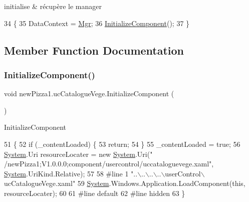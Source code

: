 initialise \& récupère le manager 


\begin{DoxyCode}
34         \{
35             DataContext = \hyperlink{classnewPizza1_1_1ucCatalogueVege_ad21f5966af508301ef7618c6a53af352}{Mgr};
36             \hyperlink{classnewPizza1_1_1ucCatalogueVege_afc2e8f9dfd99c8252e745a8636e230da}{InitializeComponent}();
37         \}
\end{DoxyCode}


\subsection{Member Function Documentation}
\mbox{\label{classnewPizza1_1_1ucCatalogueVege_afc2e8f9dfd99c8252e745a8636e230da}} 
\subsubsection{\texorpdfstring{Initialize\+Component()}{InitializeComponent()}\hspace{0.1cm}{\footnotesize\ttfamily [1/6]}}
{\footnotesize\ttfamily void new\+Pizza1.\+uc\+Catalogue\+Vege.\+Initialize\+Component (\begin{DoxyParamCaption}{ }\end{DoxyParamCaption})\hspace{0.3cm}{\ttfamily [inline]}}



Initialize\+Component 


\begin{DoxyCode}
51                                           \{
52             \textcolor{keywordflow}{if} (\_contentLoaded) \{
53                 \textcolor{keywordflow}{return};
54             \}
55             \_contentLoaded = \textcolor{keyword}{true};
56             \hyperlink{namespaceSystem}{System}.Uri resourceLocater = \textcolor{keyword}{new} \hyperlink{namespaceSystem}{System}.Uri(\textcolor{stringliteral}{"
      /newPizza1;V1.0.0.0;component/usercontrol/uccataloguevege.xaml"}, \hyperlink{namespaceSystem}{System}.UriKind.Relative);
57             
58 \textcolor{preprocessor}{            #line 1 "..\(\backslash\)..\(\backslash\)..\(\backslash\)..\(\backslash\)userControl\(\backslash\)ucCatalogueVege.xaml"
}
59             \hyperlink{namespaceSystem}{System}.Windows.Application.LoadComponent(\textcolor{keyword}{this}, resourceLocater);
60             
61 \textcolor{preprocessor}{            #line default
}
62 \textcolor{preprocessor}{            #line hidden
}
63         \}
\end{DoxyCode}
\mbox{\label{classnewPizza1_1_1ucCatalogueVege_afc2e8f9dfd99c8252e745a8636e230da}} 
